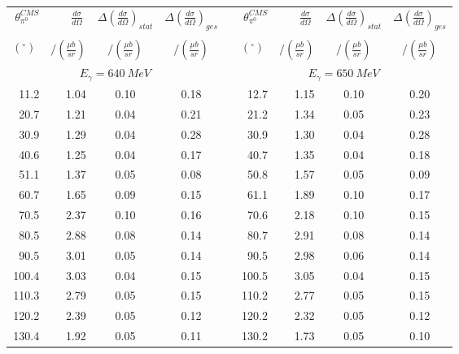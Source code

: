 \begin{table}[htbp] 
\begin{center} 
\begin{tabular}{|r|r|c|c|l|r|r|c|c|} 

\cline{1-4}
\cline{6-9} 
$\theta_{\pi^0}^{CMS}$ & 
$\displaystyle\frac{d\sigma}{d\Omega}\;$ & 
${\Delta}\left( \frac{d\sigma}{d\Omega}\right)_{stat}$ & 
${\Delta}\left( \frac{d\sigma}{d\Omega}\right)_{ges}$ & & 
$\theta_{\pi^0}^{CMS}$ & 
$\displaystyle\frac{d\sigma}{d\Omega}\;$ & 
${\Delta}\left( \frac{d\sigma}{d\Omega}\right)_{stat}$ & 
${\Delta}\left( \frac{d\sigma}{d\Omega}\right)_{ges}$ \\ 
& & & & & & & &\\ 
 $(^{\circ})\;$ & $/(\frac{{\mu}b}{sr})$ & $/(\frac{{\mu}b}{sr})$ & $/(\frac{{\mu}b}{sr})$ & & $(^{\circ})\;$ & $/(\frac{{\mu}b}{sr})$ & $/(\frac{{\mu}b}{sr})$ & $/(\frac{{\mu}b}{sr})$ \\ 
\cline{1-4} 
\cline{6-9} 
\multicolumn{4}{|c|}{ $E_{\gamma}=640~MeV$} & & 
\multicolumn{4}{c|}{ $E_{\gamma}=650~MeV$} \\ 
\cline{1-4} 
\cline{6-9} 
 11.2 &  1.04 &  0.10 &  0.18 & &  12.7 &  1.15 &  0.10 &  0.20 \\ 
 20.7 &  1.21 &  0.04 &  0.21 & &  21.2 &  1.34 &  0.05 &  0.23 \\ 
 30.9 &  1.29 &  0.04 &  0.28 & &  30.9 &  1.30 &  0.04 &  0.28 \\ 
 40.6 &  1.25 &  0.04 &  0.17 & &  40.7 &  1.35 &  0.04 &  0.18 \\ 
 51.1 &  1.37 &  0.05 &  0.08 & &  50.8 &  1.57 &  0.05 &  0.09 \\ 
 60.7 &  1.65 &  0.09 &  0.15 & &  61.1 &  1.89 &  0.10 &  0.17 \\ 
 70.5 &  2.37 &  0.10 &  0.16 & &  70.6 &  2.18 &  0.10 &  0.15 \\ 
 80.5 &  2.88 &  0.08 &  0.14 & &  80.7 &  2.91 &  0.08 &  0.14 \\ 
 90.5 &  3.01 &  0.05 &  0.14 & &  90.5 &  2.98 &  0.06 &  0.14 \\ 
100.4 &  3.03 &  0.04 &  0.15 & & 100.5 &  3.05 &  0.04 &  0.15 \\ 
110.3 &  2.79 &  0.05 &  0.15 & & 110.2 &  2.77 &  0.05 &  0.15 \\ 
120.2 &  2.39 &  0.05 &  0.12 & & 120.2 &  2.32 &  0.05 &  0.12 \\ 
130.4 &  1.92 &  0.05 &  0.11 & & 130.2 &  1.73 &  0.05 &  0.10 \\ 

\end{tabular}
\end{center}
\end{table}
